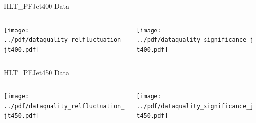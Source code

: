 \documentclass[9pt]{beamer}
\begin{document}
\begin{frame}[t]{HLT\_PFJet400 Data}
\begin{columns}[T]
  \begin{column}{.5\textwidth}
  \texttt{[image: ../pdf/dataquality\_relfluctuation\_jt400.pdf]}
  \end{column}
  \begin{column}{.5\textwidth}
  \texttt{[image: ../pdf/dataquality\_significance\_jt400.pdf]}
  \end{column}
\end{columns}
\end{frame}

\begin{frame}[t]{HLT\_PFJet450 Data}
\begin{columns}[T]
  \begin{column}{.5\textwidth}
  \texttt{[image: ../pdf/dataquality\_relfluctuation\_jt450.pdf]}
  \end{column}
  \begin{column}{.5\textwidth}
  \texttt{[image: ../pdf/dataquality\_significance\_jt450.pdf]}
  \end{column}
\end{columns}
\end{frame}

%
%
\end{document}
